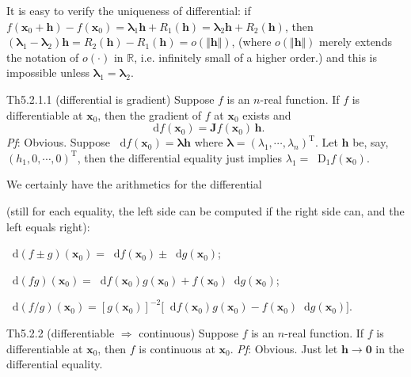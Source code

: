 \documentclass{article}
\newcommand{\dif}{\mathop{}\!\mathrm{d}}
\newcommand{\Dif}{\mathop{}\!\mathrm{D}}
\begin{document}
\begin{Rmk}{}
    It is easy to verify \textcolor{Th}{the uniqueness of differential:} if $f(\pmb{x}_0 + \pmb{h}) - f(\pmb{x}_0) = \pmb{\lambda}_1\pmb{h} + R_1(\pmb{h}) = \pmb{\lambda}_2\pmb{h} + R_2(\pmb{h})$, then $(\pmb{\lambda}_1 - \pmb{\lambda}_2)\pmb{h} = R_2(\pmb{h}) - R_1(\pmb{h}) = o(\Vert \pmb{h}\Vert)$, (\textcolor{Df}{where $o(\Vert \pmb{h}\Vert)$ merely extends the notation of $o(\cdot)$ in $\mathbb{R}$, i.e. infinitely small of a higher order.}) and this is impossible unless $\pmb{\lambda}_1 = \pmb{\lambda}_2$.
\end{Rmk}

\begin{Th}{Th5.2.1.1 (differential is gradient)}
    Suppose $f$ is an $n$-real function. If $f$ is differentiable at $\pmb{x}_0$, then the gradient of $f$ at $\pmb{x}_0$ exists and
    $$\dif f(\pmb{x}_0) = \pmb{J}f(\pmb{x}_0)\,\pmb{h}.$$
    \tcblower
    \textit{Pf}: Obvious. Suppose $\dif f(\pmb{x}_0) = \pmb{\lambda h}$ where $\pmb{\lambda} = (\lambda_1, \cdots, \lambda_n)^\mathrm{T}$. Let $\pmb{h}$ be, say, $(h_1, 0, \cdots, 0)^\mathrm{T}$, then the differential equality just implies $\lambda_1 = \Dif_1 f(\pmb{x}_0)$.
\end{Th}

\begin{Rmk}{}
    We certainly have the arithmetics for the differential \textcolor{Th}{(still for each equality, the left side can be computed if the right side can, and the left equals right):
    \begin{compactenum}
        \item $\dif(f\pm g)(\pmb{x}_0) = \dif f(\pmb{x}_0)\pm\dif g(\pmb{x}_0)$;
        \item $\dif(fg)(\pmb{x}_0) = \dif f(\pmb{x}_0)g(\pmb{x}_0) + f(\pmb{x}_0)\dif g(\pmb{x}_0)$;
        \item $\dif(f/g)(\pmb{x}_0) = [g(\pmb{x}_0)]^{-2} \bigl[\dif f(\pmb{x}_0)g(\pmb{x}_0) - f(\pmb{x}_0)\dif g(\pmb{x}_0)\bigr]$.
    \end{compactenum}
    }
\end{Rmk}

\begin{Th}{Th5.2.2 (differentiable $\Rightarrow$ continuous)}
    Suppose $f$ is an $n$-real function. If $f$ is differentiable at $\pmb{x}_0$, then $f$ is continuous at $\pmb{x}_0$.
    \tcblower
    \textit{Pf}: Obvious. Just let $\pmb{h}\rightarrow \pmb{0}$ in the differential equality.
\end{Th}
\end{document}
